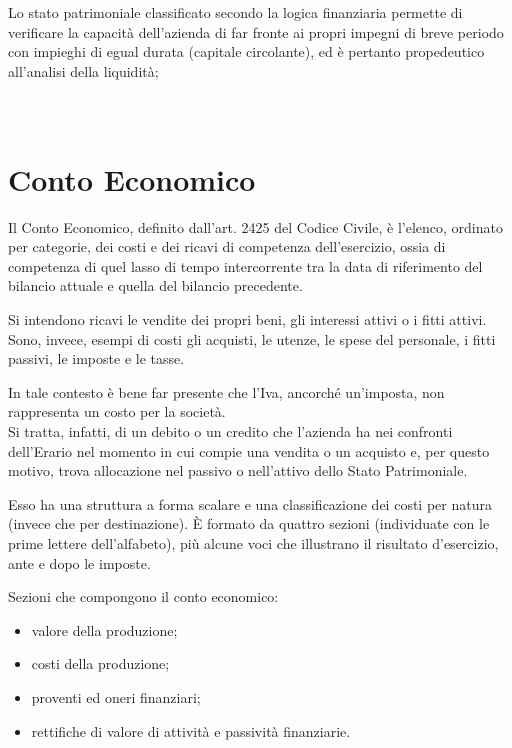 Lo stato patrimoniale classificato secondo la logica finanziaria permette di verificare la capacità dell’azienda di far fronte ai propri impegni di breve periodo con impieghi di egual durata (capitale circolante), ed è pertanto propedeutico all’analisi della liquidità;
\\
\\
\\


\section{Conto Economico}

Il Conto Economico, definito dall'art. 2425 del Codice Civile, è l'elenco, ordinato per categorie, dei costi e dei ricavi di competenza dell'esercizio, ossia di competenza di quel lasso di tempo intercorrente tra la data di riferimento del bilancio attuale e quella del bilancio precedente.

Si intendono ricavi le vendite dei propri beni, gli interessi attivi o i fitti attivi. 
Sono, invece, esempi di costi gli acquisti, le utenze, le spese del personale, i fitti passivi, le imposte e le tasse. 

In tale contesto è bene far presente che l'Iva, ancorché un'imposta, non rappresenta un costo per la società. \\
Si tratta, infatti, di un debito o un credito che l'azienda ha nei confronti dell'Erario nel momento in cui compie una vendita o un acquisto e, per questo motivo, trova allocazione nel passivo o nell'attivo dello Stato Patrimoniale.

Esso ha una struttura a forma scalare e una classificazione dei costi per natura (invece che per destinazione). È formato da quattro sezioni (individuate con le prime lettere dell'alfabeto), più alcune voci che illustrano il risultato d'esercizio, ante e dopo le imposte.

Sezioni che compongono il conto economico:
\begin{itemize}
 \item valore della produzione;
 \item costi della produzione;
 \item proventi ed oneri finanziari;
 \item rettifiche di valore di attività e passività finanziarie.
\end{itemize}

